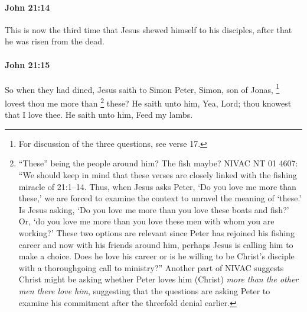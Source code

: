 		\paragraph{John 21:14} %
			\label{JOHN-21-14}

			This is now the third time that Jesus shewed himself to his disciples, after that he was risen from the dead.

			\begin{framed}
				\scriptsize
				\begin{compactdesc}
					\item[SBLG] 
				\end{compactdesc}
			\end{framed}

		\paragraph{John 21:15} %
			\label{JOHN-21-15}

			So when they had dined, Jesus saith to Simon Peter, Simon, son of Jonas,
				\footnote{%
					For discussion of the three questions, see verse 17.
					}%
			lovest thou me more than
				\footnote{%
					``These'' being the people around him? The fish maybe? NIVAC NT 01 4607: ``We should keep in mind that these verses are closely linked with the fishing miracle of 21:1--14. Thus, when Jesus asks Peter, `Do you love me more than these,' we are forced to examine the context to unravel the meaning of `these.' Is Jesus asking, `Do you love me more than you love these boats and fish?' Or, `do you love me more than you love these men with whom you are working?' These two options are relevant since Peter has rejoined his fishing career and now with his friends around him, perhaps Jesus is calling him to make a choice. Does he love his career or is he willing to be Christ's disciple with a thoroughgoing call to ministry?'' Another part of NIVAC suggests Christ might be asking whether Peter loves him (Christ) \textit{more than the other men there love him}, suggesting that the questions are asking Peter to examine his commitment after the threefold denial earlier.
					}%
			these? He saith unto him, Yea, Lord; thou knowest that I love thee. He saith unto him, Feed my lambs.

